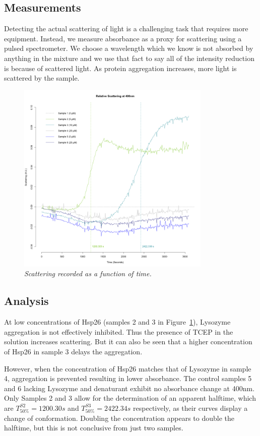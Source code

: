 \documentclass[a4paper,10pt]{article}
\begin{document}
        \subsection*{Measurements}
            Detecting the actual scattering of light is a challenging task that requires more equipment.
            Instead, we measure absorbance as a proxy for scattering using a pulsed spectrometer.
            We choose a wavelength which we know is not absorbed by anything in the mixture and 
            we use that fact to say all of the intensity reduction is because of scattered light.
            As protein aggregation increases, more light is scattered by the sample. 
            \begin{figure}[H]
                \centering
                \includegraphics[width=350px]{../resources/aggregation_main.png}
                \caption{\it Scattering recorded as a function of time.}\label{fig:agg_main}
            \end{figure}

        \subsection*{Analysis}
            At low concentrations of Hsp26 (samples 2 and 3 in Figure~\ref{fig:agg_main}), 
            Lysozyme aggregation is not effectively inhibited. 
            Thus the presence of TCEP in the solution increases scattering. 
            But it can also be seen that a higher concentration of Hsp26 in sample 3 delays the aggregation.
            
            However, when the concentration of Hsp26 matches that of Lysozyme in sample 4, 
            aggregation is prevented resulting in lower absorbance.
            The control samples 5 and 6 lacking Lysozyme and denaturant exhibit no absorbance change at 400nm. 
            Only Samples 2 and 3 allow for the determination of an apparent halftime, which are $T^{S2}_{50\%} = 1200.30s$
            and $T^{S3}_{50\%} = 2422.34s$ respectively, as their curves display a change of conformation.
            Doubling the concentration appears to double the halftime, but this is not conclusive from just two samples.
    \pagebreak
    
\end{document}
